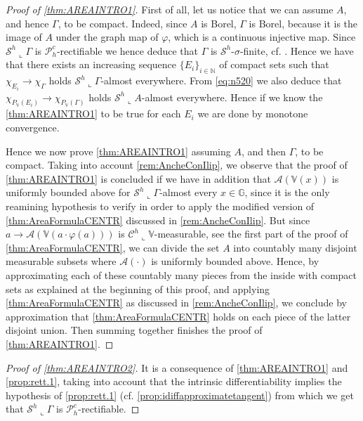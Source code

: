 \documentclass[10pt, a4paper,
oneside, headinclude,footinclude]{scrartcl}
\begin{document}
\begin{proof}[Proof of \cref{thm:AREAINTRO1}]
First of all, let us notice that we can assume $A$, and hence $\Gamma$, to be compact. Indeed, since $A$ is Borel, $\Gamma$ is Borel, because it is the image of $A$ under the graph map of $\varphi$, which is a continuous injective map. Since $\mathcal{S}^h\llcorner\Gamma$ is $\mathscr{P}_h^c$-rectifiable we hence deduce that $\Gamma$ is $\mathcal{S}^h$-$\sigma$-finite, cf. \cite[Proposition 2.4 and Proposition 2.5]{antonelli2020rectifiable}. Hence we have that there exists an increasing sequence $\{E_i\}_{i\in\mathbb N}$ of compact sets such that $\chi_{E_i}\to\chi_{\Gamma}$ holds  $\mathcal{S}^h\llcorner\Gamma$-almost everywhere. From \eqref{eq:n520} we also deduce that $\chi_{P_{\mathbb V}(E_i)}\to\chi_{P_{\mathbb V}(\Gamma)}$ holds $\mathcal{S}^h\llcorner A$-almost everywhere. Hence if we know the \cref{thm:AREAINTRO1} to be true for each $E_i$ we are done by monotone convergence.
 
Hence we now prove \cref{thm:AREAINTRO1} assuming $A$, and then $\Gamma$, to be compact. Taking into account \cref{rem:AncheConIlip}, we observe that the proof of \cref{thm:AREAINTRO1} is concluded if we have in addition that $\mathcal{A}(\mathbb V(x))$ is uniformly bounded above for $\mathcal{S}^h\llcorner\Gamma$-almost every $x\in\mathbb G$, since it is the only reamining hypothesis to verify in order to apply the modified version of \cref{thm:AreaFormulaCENTR} discussed in \cref{rem:AncheConIlip}. But since $a\to\mathcal{A}(\mathbb V(a\cdot\varphi(a)))$ is $\mathcal{C}^h\llcorner\mathbb V$-measurable, see the first part of the proof of \cref{thm:AreaFormulaCENTR}, we can divide the set $A$ into countably many disjoint measurable subsets where $\mathcal{A}(\cdot)$ is uniformly bounded above. Hence, by approximating each of these countably many pieces from the inside with compact sets as explained at the beginning of this proof, and applying \cref{thm:AreaFormulaCENTR} as discussed in \cref{rem:AncheConIlip}, we conclude by approximation that \cref{thm:AreaFormulaCENTR} holds on each piece of the latter disjoint union. Then summing together finishes the proof of \cref{thm:AREAINTRO1}.
\end{proof}
\begin{proof}[Proof of \cref{thm:AREAINTRO2}]
It is a consequence of \cref{thm:AREAINTRO1} and \cref{prop:rett.1}, taking into account that the intrinsic differentiability implies the hypothesis of \cref{prop:rett.1} (cf. \cref{prop:idiffapproximatetangent}) from which we get that $\mathcal{S}^h\llcorner\Gamma$ is $\mathscr{P}_h^c$-rectifiable.
\end{proof}
\end{document}
